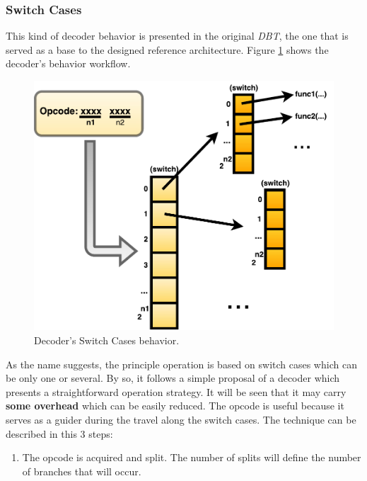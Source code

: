 \documentclass[12pt]{article}
\begin{document}
{\subsubsection{Switch Cases}
    This kind of decoder behavior is presented in the original \textit{DBT}, the one that is served as a base to the designed reference architecture. Figure \ref{fig:Decoders_Behavior1} shows the decoder's behavior workflow.

    \begin{figure}[!htb]
        \centerline{
        \includegraphics[scale=0.5]{images/Decoders_Behavior1}
        }
        \caption{Decoder's Switch Cases behavior.}
        \label{fig:Decoders_Behavior1} 
        \end{figure}
    
     As the name suggests, the principle operation is based on switch cases which can be only one or several. By so, it follows a simple proposal of a decoder which presents a straightforward operation strategy. It will be seen that it may carry \textbf{some overhead} which can be easily reduced. The opcode is useful because it serves as a guider during the travel along the switch cases. The technique can be described in this 3 steps:
    
    \begin{enumerate}
    
   		\item The opcode is acquired and split. The number of splits will define the number of branches that will occur.
        

\end{enumerate}}
\end{document}
